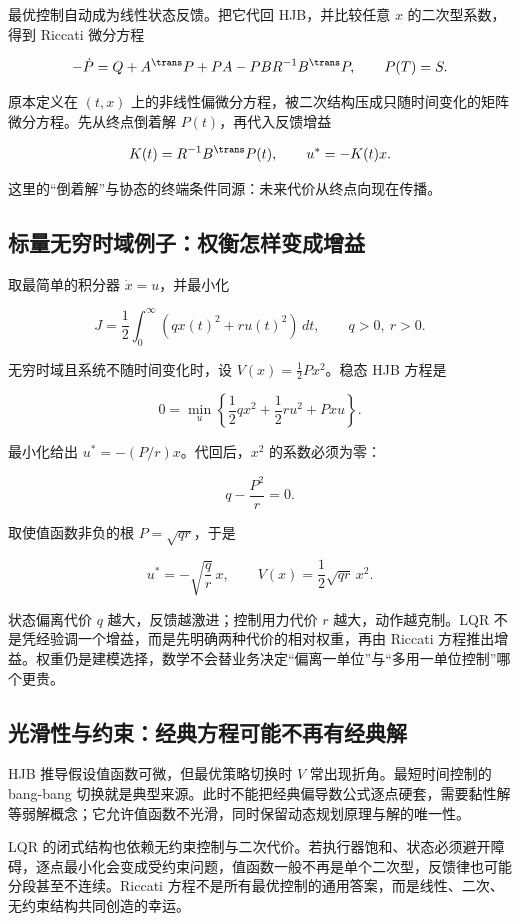 最优控制自动成为线性状态反馈。把它代回 HJB，并比较任意 \(x\) 的二次型系数，得到 Riccati 微分方程

\[
-\dot P
=Q+A^\trans P+PA-PBR^{-1}B^\trans P,
\qquad
P(T)=S.
\]

原本定义在 \((t,x)\) 上的非线性偏微分方程，被二次结构压成只随时间变化的矩阵微分方程。先从终点倒着解 \(P(t)\)，再代入反馈增益

\[
K(t)=R^{-1}B^\trans P(t),
\qquad
u^\ast=-K(t)x.
\]

这里的``倒着解''与协态的终端条件同源：未来代价从终点向现在传播。

\subsection{标量无穷时域例子：权衡怎样变成增益}

取最简单的积分器 \(\dot x=u\)，并最小化

\[
J=\frac12\int_0^\infty
\left(qx(t)^2+ru(t)^2\right)\,dt,
\qquad q>0,\ r>0.
\]

无穷时域且系统不随时间变化时，设 \(V(x)=\tfrac12Px^2\)。稳态 HJB 方程是

\[
0=\min_u
\left\{
\frac12qx^2+\frac12ru^2+Pxu
\right\}.
\]

最小化给出 \(u^\ast=-(P/r)x\)。代回后，\(x^2\) 的系数必须为零：

\[
q-\frac{P^2}{r}=0.
\]

取使值函数非负的根 \(P=\sqrt{qr}\)，于是

\[
u^\ast=-\sqrt{\frac qr}\,x,
\qquad
V(x)=\frac12\sqrt{qr}\,x^2.
\]

状态偏离代价 \(q\) 越大，反馈越激进；控制用力代价 \(r\) 越大，动作越克制。LQR 不是凭经验调一个增益，而是先明确两种代价的相对权重，再由 Riccati 方程推出增益。权重仍是建模选择，数学不会替业务决定``偏离一单位''与``多用一单位控制''哪个更贵。

\subsection{光滑性与约束：经典方程可能不再有经典解}

HJB 推导假设值函数可微，但最优策略切换时 \(V\) 常出现折角。最短时间控制的 bang-bang 切换就是典型来源。此时不能把经典偏导数公式逐点硬套，需要黏性解等弱解概念；它允许值函数不光滑，同时保留动态规划原理与解的唯一性。

LQR 的闭式结构也依赖无约束控制与二次代价。若执行器饱和、状态必须避开障碍，逐点最小化会变成受约束问题，值函数一般不再是单个二次型，反馈律也可能分段甚至不连续。Riccati 方程不是所有最优控制的通用答案，而是线性、二次、无约束结构共同创造的幸运。

